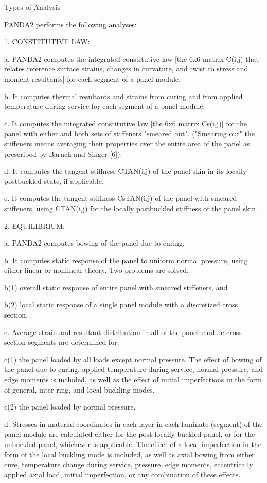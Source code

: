 Types of Analysis

PANDA2 performs the following analyses:

1. CONSTITUTIVE LAW:

a. PANDA2 computes the integrated constitutive law [the 6x6 matrix C(i,j)
that relates reference surface strains, changes in curvature, and twist to
stress and moment resultants] for each segment of a panel module. 

b. It computes thermal resultants and strains from curing and from applied
temperature during service for each segment of a panel module. 

c. It computes the integrated constitutive law [the 6x6 matrix Cs(i,j)]
for the panel with either and both sets of stiffeners "smeared out".
("Smearing out" the stiffeners means averaging their properties over the
entire area of the panel as prescribed by Baruch and Singer [6]). 

d. It computes the tangent stiffness CTAN(i,j) of the panel skin in its
locally postbuckled state, if applicable. 

e. It computes the tangent stiffness CsTAN(i,j) of the panel with smeared
stiffeners, using CTAN(i,j) for the locally postbuckled stiffness of the
panel skin. 


2. EQUILIBRIUM:

a. PANDA2 computes bowing of the panel due to curing. 

b. It computes static response of the panel to uniform normal pressure,
using either linear or nonlinear theory.  Two problems are solved: 

b(1) overall static response of entire panel with smeared stiffeners, and 

b(2) local static response of a single panel module with a discretized
cross section. 

c. Average strain and resultant distribution in all of the panel module
cross section segments are determined for: 

c(1) the panel loaded by all loads except normal pressure. The effect of
bowing of the panel due to curing, applied temperature during service,
normal pressure, and edge moments is included, as well as the effect of
initial imperfections in the form of general, inter-ring, and local
buckling modes.

c(2) the panel loaded by normal pressure.

d. Stresses in material coordinates in each layer in each laminate
(segment) of the panel module are calculated either for the post-locally
buckled panel, or for the unbuckled panel, whichever is applicable. The
effect of a local imperfection in the form of the local buckling mode is
included, as well as axial bowing from either cure, temperature change
during service, pressure, edge moments, eccentrically applied axial load,
initial imperfection, or any combination of these effects. 

